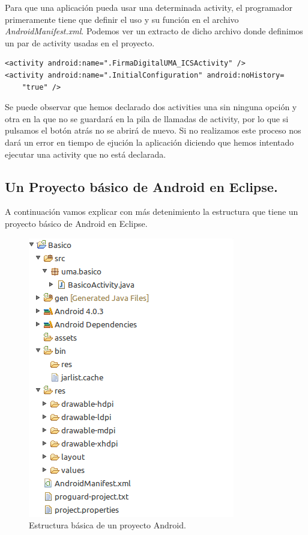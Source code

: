 \begin{itemize}
Para que una aplicación pueda usar una determinada activity, el programador primeramente tiene que definir el uso y su función en el archivo \textit{AndroidManifest.xml}. Podemos ver un extracto de dicho archivo donde definimos un par de activity usadas en el proyecto.
\newpage
\begin{lstlisting}[style=XML]
<activity android:name=".FirmaDigitalUMA_ICSActivity" />
<activity android:name=".InitialConfiguration" android:noHistory=
	"true" />
\end{lstlisting}

Se puede observar que hemos declarado dos activities una sin ninguna opción y otra en la que no se guardará en la pila de llamadas de activity, por lo que si pulsamos el botón atrás no se abrirá de nuevo. Si no realizamos este proceso nos dará un error en tiempo de ejución la aplicación diciendo que hemos intentado ejecutar una activity que no está declarada.

\subsection{Un Proyecto básico de Android en Eclipse.}\label{cap:proyectoBasico}

A continuación vamos explicar con más detenimiento la estructura que tiene un proyecto básico de Android en Eclipse.

\begin{figure}
  \centering
    \includegraphics[scale=1]{./Android/imagenes/estructuraBasicaAndroid.png}
  \caption{Estructura básica de un proyecto Android.}
  \label{fig:estructuraBasicaAndroid}
\end{figure}


\end{itemize}
